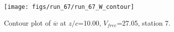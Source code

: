 \begin{figure}[H]
\centering
\texttt{[image: figs/run\_67/run\_67\_W\_contour]}
\caption{Contour plot of $\overline{w}$ at $z/c$=10.00, $V_{free}$=27.05, station 7.}
\end{figure}


